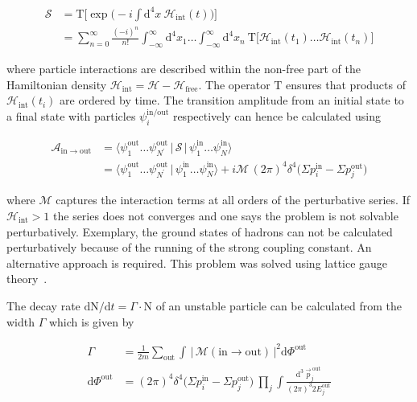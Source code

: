 \begin{align}
\mathcal{S}&=\mathrm{T}\Big[\exp\Big(-i\int\mathrm{d}^{4}x~\mathcal{H}_\mathrm{int}(t)\Big)\Big]\\
&=\sum_{n=0}^{\infty}\frac{(-i)^{n}}{n!}\int_{-\infty}^{\infty}\mathrm{d}^{4}x_{1}\ldots \int_{-\infty}^{\infty}\mathrm{d}^{4}x_{n}~\mathrm{T}\Big[\mathcal{H}_\mathrm{int}(t_{1})\ldots\mathcal{H}_\mathrm{int}(t_{n})\Big] \label{eq:theory-dyson-series}
\end{align}

where particle interactions are described within the non-free part of the Hamiltonian density $\mathcal{H}_\mathrm{int}=\mathcal{H}-\mathcal{H}_\mathrm{free}$. The operator $\mathrm{T}$ ensures that products of $\mathcal{H}_\mathrm{int}(t_{i})$ are ordered by time. The transition amplitude from an initial state to a final state with particles $\psi_i^\mathrm{in/out}$ respectively can hence be calculated using

\begin{align}
\mathcal{A}_\mathrm{in\to out}&=\langle\psi_{1}^\mathrm{out}\ldots\psi_{N^{\prime}}^\mathrm{out}\,|\,\mathcal{S}\,|\,\psi_{1}^\mathrm{in}\ldots\psi_{N}^\mathrm{in}\rangle \\
&=\langle\psi_{1}^\mathrm{out}\ldots\psi_{N^{\prime}}^\mathrm{out}\,|\,\psi_{1}^\mathrm{in}\ldots\psi_{N}^\mathrm{in}\rangle+i\mathcal{M}\,(2\pi)^{4}\delta^{4}\big(\Sigma p^\mathrm{in}_{i}-\Sigma p^\mathrm{out}_{j}\big)
\end{align}

where $\mathcal{M}$ captures the interaction terms at all orders of the perturbative series. If $\mathcal{H}_\mathrm{int}>1$ the series does not converges and one says the problem is not solvable perturbatively. Exemplary, the ground states of hadrons can not be calculated perturbatively because of the running of the strong coupling constant. An alternative approach is required. This problem was solved using lattice gauge theory~\cite{Durr:2008zz}.

The decay rate $\mathrm{d}\mathrm{N}/\mathrm{d}t=\Gamma\cdot\mathrm{N}$ of an unstable particle can be calculated from the width $\Gamma$ which is given by

\begin{align}
\Gamma&=\frac{1}{2m}\sum_\mathrm{out}\int\,\big|\,\mathcal{M}(\mathrm{in}\to\mathrm{out})\,\big|^2\mathrm{d}\Phi^\mathrm{out}\\
\mathrm{d}\Phi^\mathrm{out}&=(2\pi)^{4}\delta^{4}\big(\Sigma p^\mathrm{in}_{i}-\Sigma p^\mathrm{out}_{j}\big)~\prod_{j}\int\frac{\mathrm{d}^{3}~\vec{p}^\mathrm{~out}_{j}}{(2\pi)^{3}2E_{j}^\mathrm{out}}
\end{align}

